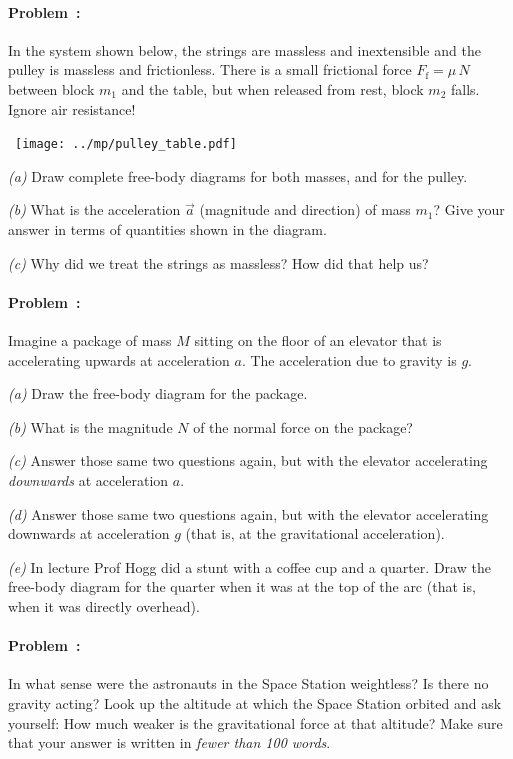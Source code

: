 \documentclass[12pt]{article}
\begin{document}
\paragraph{Problem~\theproblem:}%
In the system shown below, the strings are massless and inextensible
and the pulley is massless and frictionless.  There is a small
frictional force $F_\mathrm{f}=\mu\,N$ between block $m_1$ and the
table, but when released from rest, block $m_2$ falls. Ignore air
resistance!

\noindent~\hfill\texttt{[image: ../mp/pulley\_table.pdf]}\hfill~

\textsl{(a)} Draw complete free-body diagrams for both masses, and for
the pulley.

\textsl{(b)} What is the acceleration $\vec{a}$ (magnitude and
direction) of mass $m_1$?  Give your answer in terms of quantities
shown in the diagram.

\textsl{(c)} Why did we treat the strings as massless? How did that
help us?

\paragraph{Problem~\theproblem:}%
Imagine a package of mass $M$ sitting on the floor of an elevator that
is accelerating upwards at acceleration $a$. The acceleration due to
gravity is $g$.

\textsl{(a)} Draw the free-body diagram for the package.

\textsl{(b)} What is the magnitude $N$ of the normal force on the
package?

\textsl{(c)} Answer those same two questions again, but with the
elevator accelerating \emph{downwards} at acceleration $a$.

\textsl{(d)} Answer those same two questions again, but with the
elevator accelerating downwards at acceleration $g$ (that is, at
the gravitational acceleration).

\textsl{(e)} In lecture Prof Hogg did a stunt with a coffee cup and a
quarter. Draw the free-body diagram for the quarter when it was at the
top of the arc (that is, when it was directly overhead).

\paragraph{Problem~\theproblem:}%
In what sense were the astronauts in the Space Station weightless? Is
there no gravity acting? Look up the altitude at which the Space
Station orbited and ask yourself: How much weaker is the gravitational
force at that altitude? Make sure that your answer is written in \emph{fewer than 100 words}.
\end{document}
